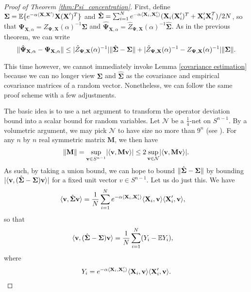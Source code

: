\documentclass[final,12pt]{colt2018} %
\numberwithin{equation}{section}
\DeclarePairedDelimiter{\abs}{\lvert}{\rvert}
\DeclarePairedDelimiter{\norm}{\lVert}{\rVert}
\DeclarePairedDelimiter{\paren}{(}{)}
\DeclarePairedDelimiter{\braces}{\lbrace}{\rbrace}
\DeclarePairedDelimiter{\inprod}{\langle}{\rangle}
\newcommand{\E}{\mathbb{E}}
\newcommand{\boldv}{\textbf{v}}
\newcommand{\boldSigma}{\boldsymbol{\Sigma}}
\newcommand{\boldPsi}{\boldsymbol{\Psi}}
\newcommand{\boldX}{\textbf{X}}
\newcommand{\boldM}{\textbf{M}}
\begin{document}
\begin{proof}[Proof of Theorem \ref{thm:Psi_concentration}]
	First, define $\boldSigma = \E\braces{e^{-\alpha\inprod{\boldX,\boldX'}}\boldX(\boldX')^T}$ and $\hat{\boldSigma} = \sum_{i=1}^N e^{-\alpha\inprod{\boldX_i,\boldX_i'}}\paren{\boldX_i\paren{\boldX_i'}^T + \boldX_i'\boldX_i^T}/2N$, so that $\boldPsi_{\boldX,\alpha} = Z_{\boldPsi,\boldX}(\alpha)^{-1}\boldSigma$ and $\hat{\boldPsi}_{\boldX,\alpha} = \hat{Z}_{\boldPsi,\boldX}(\alpha)^{-1}\hat{\boldSigma}$. As in the previous theorem, we can write
	\begin{align} \label{Psi decomposition}
	\norm{\hat{\boldPsi}_{\boldX,\alpha} - \boldPsi_{\boldX,\alpha}} \leq \abs{\hat{Z}_{\boldPsi,\boldX}(\alpha)^{-1}}\norm{\hat{\boldSigma} - \boldSigma} + \abs{\hat{Z}_{\boldPsi,\boldX}(\alpha)^{-1}-Z_{\boldPsi,\boldX}(\alpha)^{-1}}\norm{\boldSigma}.
	\end{align}
	
	This time however, we cannot immediately invoke Lemma \ref{covariance estimation} because we can no longer view $\boldSigma$ and $\hat{\boldSigma}$ as the covariance and empirical covariance matrices of a random vector. Nonetheless, we can follow the same proof scheme with a few adjustments.
	
	The basic idea is to use a net argument to transform the operator deviation bound into a scalar bound for random variables. Let $\mathcal{N}$ be a $\frac{1}{4}$-net on $S^{n-1}$. By a volumetric argument, we may pick $\mathcal{N}$ to have size no more than $9^n$ (see \cite{Vershynin2011b}). For any $n$ by $n$ real symmetric matrix $\boldM$, we then have
	\begin{align} \label{net operator bound}
	\norm{\boldM} = \sup_{\boldv \in S^{n-1}}\abs{\inprod{\boldv,\boldM\boldv}} \leq 2\sup_{\boldv \in \mathcal{N}}\abs{\inprod{\boldv,\boldM\boldv}}.
	\end{align}
	As such, by taking a union bound, we can hope to bound $\norm{\hat{\boldSigma} - \boldSigma}$ by bounding $\abs{\inprod{\boldv,(\hat{\boldSigma}-\boldSigma)\boldv}}$ for a fixed unit vector $v \in S^{n-1}$. Let us do just this. We have
	\begin{align*}
	\inprod{\boldv,\hat{\boldSigma}\boldv} & = \frac{1}{N} \sum_{i=1}^N e^{-\alpha\inprod{\boldX_i,\boldX_i'}}\inprod{\boldX_i,\boldv}\inprod{\boldX_i',\boldv},
	\end{align*}
	so that
	\begin{align}
	\inprod{\boldv,(\hat{\boldSigma}-\boldSigma)\boldv} & = \frac{1}{N} \sum_{i=1}^N \paren{Y_i - \E Y_i},
	\end{align}
	where
	\begin{align}
	Y_i = e^{-\alpha\inprod{\boldX_i,\boldX_i'}}\inprod{\boldX_i,\boldv}\inprod{\boldX_i',\boldv}.
	\end{align}
	

\end{proof}
\end{document}
